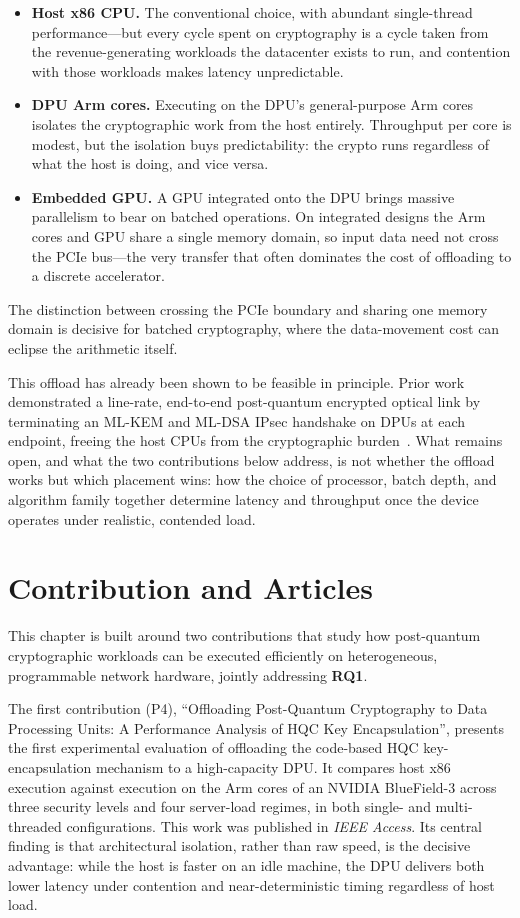 \begin{itemize}
    \item \textbf{Host x86 CPU.} The conventional choice, with abundant single-thread performance---but every cycle spent on cryptography is a cycle taken from the revenue-generating workloads the datacenter exists to run, and contention with those workloads makes latency unpredictable.
    \item \textbf{DPU Arm cores.} Executing on the DPU's general-purpose Arm cores isolates the cryptographic work from the host entirely. Throughput per core is modest, but the isolation buys predictability: the crypto runs regardless of what the host is doing, and vice versa.
    \item \textbf{Embedded GPU.} A GPU integrated onto the DPU brings massive parallelism to bear on batched operations. On integrated designs the Arm cores and GPU share a single memory domain, so input data need not cross the PCIe bus---the very transfer that often dominates the cost of offloading to a discrete accelerator.
\end{itemize}

The distinction between crossing the PCIe boundary and sharing one memory domain is decisive for batched cryptography, where the data-movement cost can eclipse the arithmetic itself.

This offload has already been shown to be feasible in principle. Prior work demonstrated a line-rate, end-to-end post-quantum encrypted optical link by terminating an ML-KEM and ML-DSA IPsec handshake on DPUs at each endpoint, freeing the host CPUs from the cryptographic burden~\cite{cano2024linerate}. What remains open, and what the two contributions below address, is not whether the offload works but which placement wins: how the choice of processor, batch depth, and algorithm family together determine latency and throughput once the device operates under realistic, contended load.

\section{Contribution and Articles}
\label{sec:pqc-context}

This chapter is built around two contributions that study how post-quantum cryptographic workloads can be executed efficiently on heterogeneous, programmable network hardware, jointly addressing \textbf{RQ1}.

The first contribution (P4), \enquote{Offloading Post-Quantum Cryptography to Data Processing Units: A Performance Analysis of HQC Key Encapsulation}, presents the first experimental evaluation of offloading the code-based HQC key-encapsulation mechanism to a high-capacity DPU. It compares host x86 execution against execution on the Arm cores of an NVIDIA BlueField-3 across three security levels and four server-load regimes, in both single- and multi-threaded configurations. This work was published in \emph{IEEE Access}. Its central finding is that architectural isolation, rather than raw speed, is the decisive advantage: while the host is faster on an idle machine, the DPU delivers both lower latency under contention and near-deterministic timing regardless of host load.

